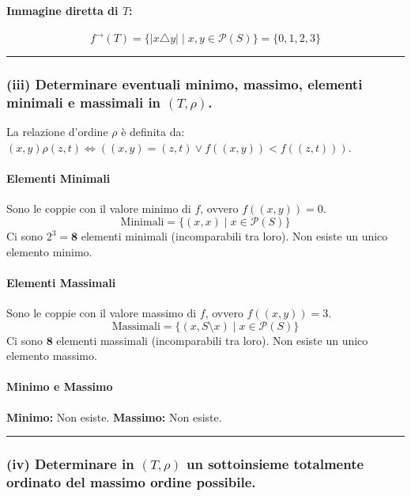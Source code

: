 \paragraph*{Immagine diretta di $T$:}
$$ f^{\rightarrow}(T) = \{|x \triangle y| \mid x, y \in \mathcal{P}(S)\} = \{0, 1, 2, 3\} $$

\vspace{0.3cm}
\hrule
\vspace{0.3cm}

\subsubsection*{(iii) Determinare eventuali minimo, massimo, elementi minimali e massimali in $(T, \rho)$.}

La relazione d'ordine $\rho$ è definita da: $(x, y) \rho (z, t) \iff ((x, y) = (z, t) \lor f((x, y)) < f((z, t)))$.

\paragraph*{Elementi Minimali}
Sono le coppie con il valore minimo di $f$, ovvero $f((x, y)) = 0$.
$$ \text{Minimali} = \{(x, x) \mid x \in \mathcal{P}(S)\} $$
Ci sono $2^3 = \mathbf{8}$ elementi minimali (incomparabili tra loro). Non esiste un unico elemento minimo.

\paragraph*{Elementi Massimali}
Sono le coppie con il valore massimo di $f$, ovvero $f((x, y)) = 3$.
$$ \text{Massimali} = \{(x, S \setminus x) \mid x \in \mathcal{P}(S)\} $$
Ci sono $\mathbf{8}$ elementi massimali (incomparabili tra loro). Non esiste un unico elemento massimo.

\paragraph*{Minimo e Massimo}
\textbf{Minimo:} Non esiste. \textbf{Massimo:} Non esiste.

\vspace{0.3cm}
\hrule
\vspace{0.3cm}

\subsubsection*{(iv) Determinare in $(T, \rho)$ un sottoinsieme totalmente ordinato del massimo ordine possibile.}

